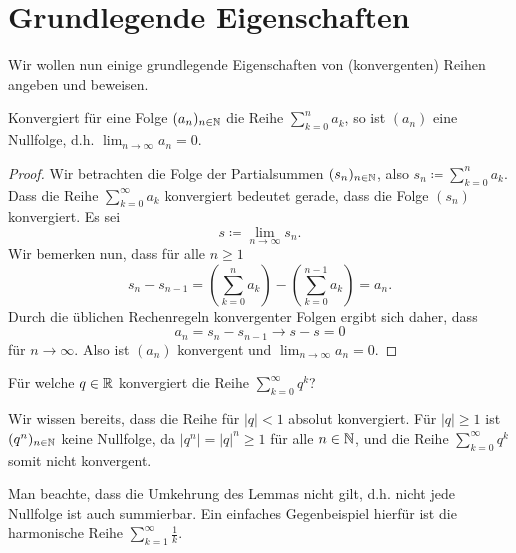 \documentclass[a4paper,10pt]{article}
\begin{document}
\section{Grundlegende Eigenschaften}


Wir wollen nun einige grundlegende Eigenschaften von (konvergenten) Reihen angeben und beweisen.


\begin{lem}\label{lem: Reihe bedeutet Nullfolge}
 Konvergiert für eine Folge $(a_n)_{n \in \mathbb{N}}$ die Reihe $\sum_{k=0}^n a_k$, so ist $(a_n)$ eine Nullfolge, d.h. $\lim_{n \to \infty} a_n = 0$.
\end{lem}
\begin{proof}
 Wir betrachten die Folge der Partialsummen $(s_n)_{n \in \mathbb{N}}$, also $s_n \coloneqq \sum_{k=0}^n a_k$. Dass die Reihe $\sum_{k=0}^\infty a_k$ konvergiert bedeutet gerade, dass die Folge $(s_n)$ konvergiert. Es sei
 \[
  s \coloneqq \lim_{n \to \infty} s_n.
 \]
 Wir bemerken nun, dass für alle $n \geq 1$
 \[
  s_n - s_{n-1}
  = \left( \sum_{k=0}^n a_k \right) - \left( \sum_{k=0}^{n-1} a_k \right)
  = a_n.
 \]
 Durch die üblichen Rechenregeln konvergenter Folgen ergibt sich daher, dass
 \[
  a_n = s_n - s_{n-1} \to s-s = 0
 \]
 für $n \to \infty$. Also ist $(a_n)$ konvergent und $\lim_{n \to \infty} a_n = 0$.
\end{proof}

\begin{question}
 Für welche $q \in \mathbb{R}$ konvergiert die Reihe $\sum_{k=0}^\infty q^k$?
\end{question}
\begin{solution}
 Wir wissen bereits, dass die Reihe für $|q| < 1$ absolut konvergiert. Für $|q| \geq 1$ ist $(q^n)_{n \in \mathbb{N}}$ keine Nullfolge, da $|q^n| = |q|^n \geq 1$ für alle $n \in \mathbb{N}$, und die Reihe $\sum_{k=0}^\infty q^k$ somit nicht konvergent.
\end{solution}


Man beachte, dass die Umkehrung des Lemmas nicht gilt, d.h. nicht jede Nullfolge ist auch summierbar. Ein einfaches Gegenbeispiel hierfür ist die harmonische Reihe $\sum_{k=1}^\infty \frac{1}{k}$.
\end{document}
